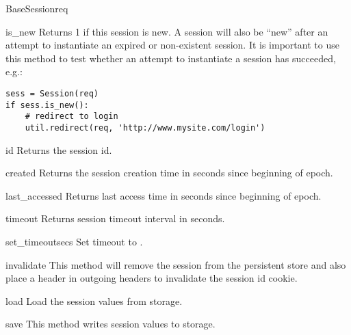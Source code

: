 \begin{classdesc}{BaseSession}{req}
  \begin{methoddesc}[BaseSession]{is_new}{}
    Returns 1 if this session is new. A session will also be ``new''
    after an attempt to instantiate an expired or non-existent
    session. It is important to use this method to test whether an
    attempt to instantiate a session has succeeded, e.g.:
    \begin{verbatim}
sess = Session(req)
if sess.is_new():
    # redirect to login
    util.redirect(req, 'http://www.mysite.com/login')
    \end{verbatim}
  \end{methoddesc}

  \begin{methoddesc}[BaseSession]{id}{}
    Returns the session id.
  \end{methoddesc}

  \begin{methoddesc}[BaseSession]{created}{}
    Returns the session creation time in seconds since beginning of
    epoch.
  \end{methoddesc}

  \begin{methoddesc}[BaseSession]{last_accessed}{}
    Returns last access time in seconds since beginning of epoch.
  \end{methoddesc}

  \begin{methoddesc}[BaseSession]{timeout}{}
    Returns session timeout interval in seconds.
  \end{methoddesc}

  \begin{methoddesc}[BaseSession]{set_timeout}{secs}
    Set timeout to .
  \end{methoddesc}

  \begin{methoddesc}[BaseSession]{invalidate}{}
    This method will remove the session from the persistent store and
    also place a header in outgoing headers to invalidate the session
    id cookie.
  \end{methoddesc}

  \begin{methoddesc}[BaseSession]{load}{}
    Load the session values from storage.
  \end{methoddesc}

  \begin{methoddesc}[BaseSession]{save}{}
    This method writes session values to storage.
  \end{methoddesc}


\end{classdesc}

